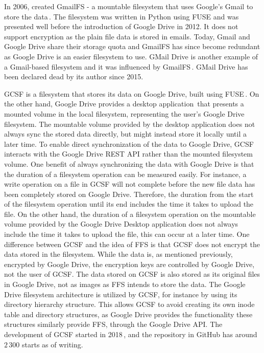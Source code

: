 In 2006, \citeauthor{jonesGoogleHackUse2006} created GmailFS - a mountable filesystem that uses Google's Gmail to store the data\,\cite{jonesGoogleHackUse2006, jonesGmailFilesystemImplementation2006}. The filesystem was written in Python using \gls{FUSE} and was presented well before the introduction of Google Drive in 2012. It does not support encryption as the plain file data is stored in emails. Today, Gmail and Google Drive share their storage quota and GmailFS has since become redundant as Google Drive is an easier filesystem to use. GMail Drive is another example of a \mbox{Gmail-based} filesystem and it was influenced by GmailFS\,\cite{viksoeViksoeDkGMail2004}. GMail Drive has been declared dead by its author since 2015.

\gls{GCSF} is a filesystem that stores its data on Google Drive, built using \gls{FUSE}\,\cite{puscassergiudanGCSFVIRTUALFILE2018,puscasHarababurelGcsf2022}. On the other hand, Google Drive provides a desktop application\,\cite{googleInstallSetGoogle} that presents a mounted volume in the local filesystem, representing the user's Google Drive filesystem. The mountable volume provided by the desktop application does not always sync the stored data directly, but might instead store it locally until a later time. To enable direct synchronization of the data to Google Drive, \gls{GCSF} interacts with the Google Drive REST \gls{API} rather than the mounted filesystem volume. One benefit of always synchronizing the data with Google Drive is that the duration of a filesystem operation can be measured easily. For instance, a write operation on a file in \gls{GCSF} will not complete before the new file data has been completely stored on Google Drive. Therefore, the duration from the start of the filesystem operation until its end includes the time it takes to upload the file. On the other hand, the duration of a filesystem operation on the mountable volume provided by the Google Drive Desktop application does not always include the time it takes to upload the file, this can occur at a later time. One difference between \gls{GCSF} and the idea of \gls{FFS} is that \gls{GCSF} does not encrypt the data stored in the filesystem. While the data is, as mentioned previously, encrypted by Google Drive, the encryption keys are controlled by Google Drive, not the user of \gls{GCSF}. The data stored on \gls{GCSF} is also stored as its original files in Google Drive, not as images as \gls{FFS} intends to store the data. The Google Drive filesystem architecture is utilized by \gls{GCSF}, for instance by using its directory hierarchy structure. This allows \gls{GCSF} to avoid creating its own inode table and directory structures, as Google Drive provides the functionality these structures similarly provide \gls{FFS}, through the Google Drive \gls{API}. The development of \gls{GCSF} started in 2018\,\cite{puscasHarababurelGcsf2022}, and the repository in GitHub has around $2\,300$ starts as of writing. 

